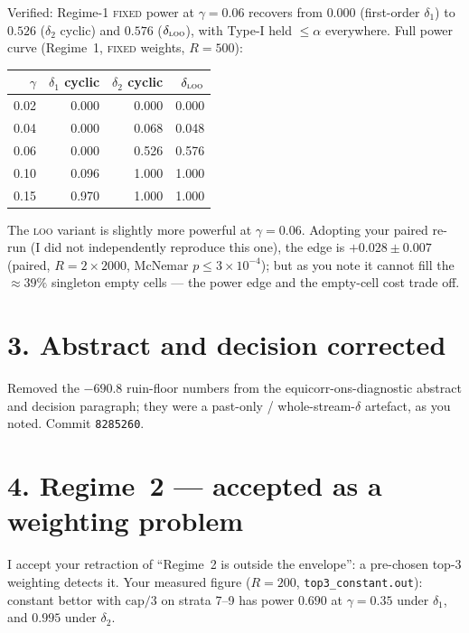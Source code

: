 \documentclass[11pt,a4paper]{article}
\begin{document}
Verified: Regime-1 \textsc{fixed} power at $\gamma = 0.06$ recovers from
$0.000$ (first-order $\delta_1$) to $0.526$ ($\delta_2$ cyclic) and $0.576$
($\delta_{\textsc{loo}}$), with Type-I held $\le \alpha$ everywhere.  Full
power curve (Regime~1, \textsc{fixed} weights, $R = 500$):

\medskip
\begin{center}
\begin{tabular}{rrrr}
\toprule
$\gamma$ & $\delta_1$ cyclic & $\delta_2$ cyclic & $\delta_{\textsc{loo}}$ \\
\midrule
0.02 & 0.000 & 0.000 & 0.000 \\
0.04 & 0.000 & 0.068 & 0.048 \\
0.06 & 0.000 & 0.526 & 0.576 \\
0.10 & 0.096 & 1.000 & 1.000 \\
0.15 & 0.970 & 1.000 & 1.000 \\
\bottomrule
\end{tabular}
\end{center}

\medskip

The \textsc{loo} variant is slightly more powerful at $\gamma = 0.06$. Adopting
your paired re-run (I did not independently reproduce this one), the edge is
$+0.028 \pm 0.007$ (paired, $R = 2\times 2000$, McNemar $p \le 3\times 10^{-4}$);
but as you note it cannot fill the ${\approx}39\%$ singleton empty cells --- the
power edge and the empty-cell cost trade off.

\section*{3. Abstract and decision corrected}

Removed the $-690.8$ ruin-floor numbers from the equicorr-ons-diagnostic
abstract and decision paragraph; they were a past-only / whole-stream-$\delta$
artefact, as you noted.  Commit \texttt{8285260}.

\section*{4. Regime~2 --- accepted as a weighting problem}

I accept your retraction of ``Regime~2 is outside the envelope'': a pre-chosen
top-3 weighting detects it.  Your measured figure ($R = 200$,
\texttt{top3\_constant.out}): constant bettor with $\mathrm{cap}/3$ on strata
7--9 has power $0.690$ at $\gamma = 0.35$ under $\delta_1$, and $0.995$ under
$\delta_2$.
\end{document}
